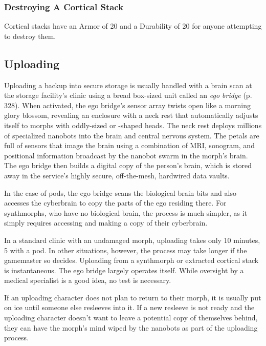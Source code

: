 \subsubsection{Destroying A Cortical Stack}

Cortical stacks have an Armor of 20 and a Durability 
of 20 for anyone attempting to destroy them.

\subsection{Uploading}

Uploading a backup into secure storage is usually 
handled with a brain scan at the storage facility's clinic 
using a bread box-sized unit called an \textit{ego bridge} (p. 
328). When activated, the ego bridge's sensor array 
twists open like a morning glory blossom, revealing an 
enclosure with a neck rest that automatically adjusts 
itself to morphs with oddly-sized or -shaped heads. 
The neck rest deploys millions of specialized nanobots 
into the brain and central nervous system. The petals 
are full of sensors that image the brain using a combination
of MRI, sonogram, and positional information
broadcast by the nanobot swarm in the morph's brain. 
The ego bridge then builds a digital copy of the person's
brain, which is stored away in the service's highly
secure, off-the-mesh, hardwired data vaults.

In the case of pods, the ego bridge scans the biological
brain bits and also accesses the cyberbrain to copy
the parts of the ego residing there. For synthmorphs, 
who have no biological brain, the process is much 
simpler, as it simply requires accessing and making a 
copy of their cyberbrain.

In a standard clinic with an undamaged morph, uploading
takes only 10 minutes, 5 with a pod. In other
situations, however, the process may take longer if the 
gamemaster so decides. Uploading from a synthmorph 
or extracted cortical stack is instantaneous. The ego 
bridge largely operates itself. While oversight by a 
medical specialist is a good idea, no test is necessary.

If an uploading character does not plan to return 
to their morph, it is usually put on ice until someone 
else resleeves into it. If a new resleeve is not ready 
and the uploading character doesn't want to leave a 
potential copy of themselves behind, they can have 
the morph's mind wiped by the nanobots as part of 
the uploading process.

